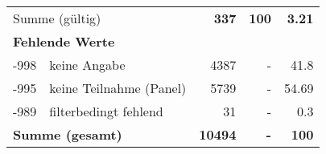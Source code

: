 \begin{longtable}{lXrrr}
     \midrule
     \multicolumn{2}{l}{Summe (gültig)} &
       \textbf{\num{337}} &
     \textbf{\num{100}} &
       \textbf{\num[round-mode=places,round-precision=2]{3.21}} \\
     \multicolumn{5}{l}{\textbf{Fehlende Werte}}\\
       -998 &
       keine Angabe &
         \num{4387} &
        - &
         \num[round-mode=places,round-precision=2]{41.8} \\
       -995 &
       keine Teilnahme (Panel) &
         \num{5739} &
        - &
         \num[round-mode=places,round-precision=2]{54.69} \\
       -989 &
       filterbedingt fehlend &
         \num{31} &
        - &
         \num[round-mode=places,round-precision=2]{0.3} \\
     \midrule
     \multicolumn{2}{l}{\textbf{Summe (gesamt)}} &
          \textbf{\num{10494}} &
        \textbf{-} &
        \textbf{\num{100}} \\
     \bottomrule
     \end{longtable}
     
